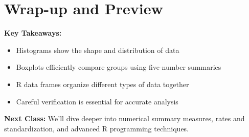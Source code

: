 \documentclass[11pt]{article}
\begin{document}
\section{Wrap-up and Preview}

\textbf{Key Takeaways:}
\begin{itemize}
\item Histograms show the shape and distribution of data
\item Boxplots efficiently compare groups using five-number summaries
\item R data frames organize different types of data together
\item Careful verification is essential for accurate analysis
\end{itemize}

\textbf{Next Class:} We'll dive deeper into numerical summary measures, rates and standardization, and advanced R programming techniques.
\end{document}
